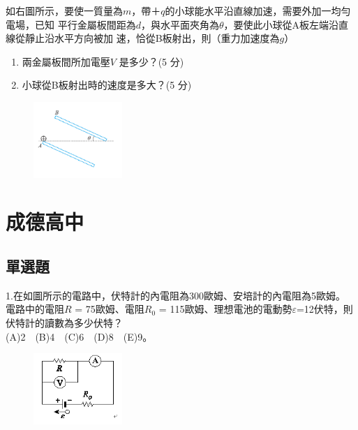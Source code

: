 \documentclass[cn,10pt,math=newtx,chinesefont=founder,device=ig]{elegantbook}
\begin{document}
\begin{example}
   如右圖所示，要使一質量為$m$，帶$＋q$的小球能水平沿直線加速，需要外加一均勻電場，已知
平行金屬板間距為$d$，與水平面夾角為$\theta$，要使此小球從A板左端沿直線從靜止沿水平方向被加
速，恰從B板射出，則（重力加速度為$g$）
\begin{enumerate}[label=(\arabic*)] 
  \item 兩金屬板間所加電壓$V$ 是多少？(5 分)
  \item 小球從B板射出時的速度是多大？(5 分)
    \end{enumerate}

    \rightline{[台中女中教甄109]}
\end{example}
\begin{solution}
    
\end{solution}
\begin{figure}[htbp]
    \flushright
    \includegraphics[width=0.3\textwidth]{image/109中女24.png}
  \end{figure}
\newpage






\chapter{成德高中}


\section{單選題}


\begin{example}
  1.在如圖所示的電路中，伏特計的內電阻為300歐姆、安培計的內電阻為5歐姆。
  電路中的電阻$R$ = 75歐姆、電阻$R_0$ = 115歐姆、理想電池的電動勢$\varepsilon $=12伏特，則伏特計的讀數為多少伏特？\\
  (A)2　(B)4　(C)6　(D)8　(E)9。\\
  \rightline{[成德高中教甄109]}
\end{example}
\begin{solution}
  
\end{solution}
\begin{figure}[htbp]
    \flushright
    \includegraphics[width=0.3\textwidth]{image/109成德1.png}
  \end{figure}
\newpage
\end{document}
